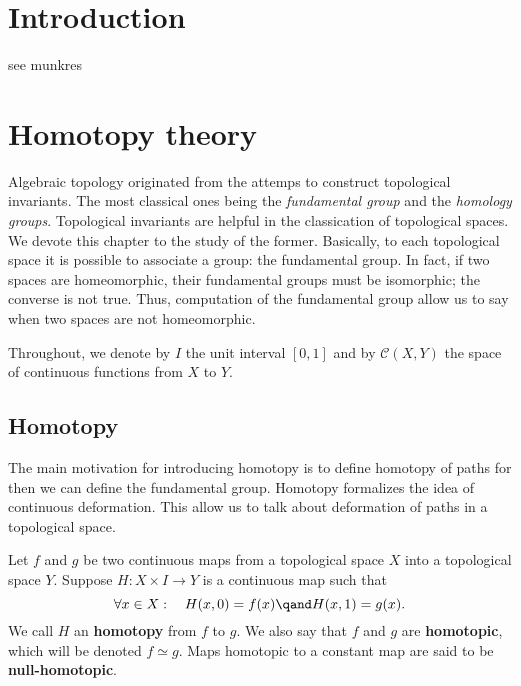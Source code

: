 \chapter{Introduction}


\begin{theoremaa}
    see munkres
\end{theoremaa}

\chapter{Homotopy theory}




Algebraic topology originated from the attemps to construct topological invariants. The most classical ones being the \textit{fundamental group} and the \textit{homology groups}. Topological invariants are helpful in the classication of topological spaces. We  devote this chapter  to the study of the former. Basically,  to each topological space it is possible to associate a group: the fundamental group. In fact, if two spaces are homeomorphic, their fundamental groups must be isomorphic; the converse is not true. Thus, computation of the fundamental group allow us to say when two spaces are not homeomorphic. 

Throughout, we denote  by \(I\) the unit interval \([0,1]\) and by \(\mathcal{C}(X,Y)\) the space of continuous functions from \(X\) to \(Y\).


\section{Homotopy}

The main motivation for introducing homotopy is to define homotopy of paths for then we can define the fundamental group.
Homotopy formalizes the idea of continuous deformation. 
This allow us to talk about deformation of paths in a topological space.


\begin{definitionn}[Homotopy]%
    Let \(f\) and \(g\) be two continuous maps from a topological space \(X\) into a topological space \(Y\). Suppose \(H \colon X\times I \to Y\) is a continuous map such that 
    \[
        \forall x\in X :\quad H(x,0) = f(x) \qand H(x,1) = g(x).
    \]
    We call \(H\) an \textbf{homotopy} from \(f\) to \(g\). We also say that \(f\) and \(g\) are \textbf{homotopic}, which will be denoted \(f\simeq g\). Maps homotopic to a constant map are said to be \textbf{null-homotopic}.
\end{definitionn}

